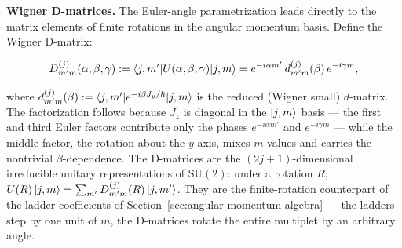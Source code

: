 \medskip\noindent\textbf{Wigner D-matrices.} The Euler-angle parametrization leads directly to the matrix elements of finite rotations in the angular momentum basis. Define the Wigner D-matrix:
\begin{linenomath}
    \begin{equation}
        D^{(j)}_{m'm}(\alpha,\beta,\gamma) := \braket{j,m'|U(\alpha,\beta,\gamma)|j,m}
        = e^{-i\alpha m'}\,d^{(j)}_{m'm}(\beta)\,e^{-i\gamma m},
        \label{eq:D-matrix-def}
    \end{equation}
\end{linenomath}
where $d^{(j)}_{m'm}(\beta):=\braket{j,m'|e^{-i\beta J_y/\hbar}|j,m}$ is the reduced (Wigner small) $d$-matrix. The factorization follows because $J_z$ is diagonal in the $\ket{j,m}$ basis --- the first and third Euler factors contribute only the phases $e^{-i\alpha m'}$ and $e^{-i\gamma m}$ --- while the middle factor, the rotation about the $y$-axis, mixes $m$ values and carries the nontrivial $\beta$-dependence. The D-matrices are the $(2j+1)$-dimensional irreducible unitary representations of $\mathrm{SU}(2)$: under a rotation $R$, $U(R)\ket{j,m}=\sum_{m'}D^{(j)}_{m'm}(R)\ket{j,m'}$. They are the finite-rotation counterpart of the ladder coefficients of Section~\ref{sec:angular-momentum-algebra} --- the ladders step by one unit of $m$, the D-matrices rotate the entire multiplet by an arbitrary angle.

